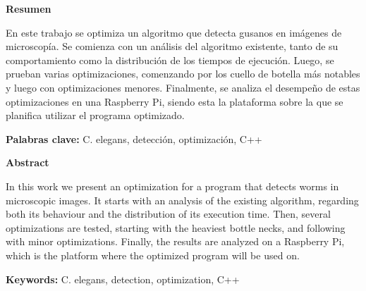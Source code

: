 \documentclass{article}
\newcommand{\comment}[1]{}
\begin{document}
\comment {
TODO:
1 - Agrandar algunos graficos
3 - Ver de agregar referencia

4 - página 5, párrafo 1: fijate que quedó "gusano" en singular y debe ser plural

5 - página 18, Fig 17: Los colores de la figura de la izquierda no entiendo en el orden que están. si fueran en orden del flujo de proceso seria mas facil de visualizar con las leyendas. Las leyendas están un poco chicas para impresión.

6 - Referencias: es deseable que en el texto vayan apareciendo en orden de numeración, y agregaría algunas más (al menos 5 más). Este punto podés por ejemplo hacer referencias a reviews, citar algun trabajo de machine learning cuando hablas de ello en la conclusión, citar algun manual de C++ cuando hablas de optimizaciones, etc
}

\centerline{\textbf{\LARGE{Resumen}}}
\vskip 0.2in

En este trabajo se optimiza un algoritmo que detecta gusanos en imágenes de microscopía. Se comienza con un análisis del algoritmo existente, tanto de su comportamiento como la distribución de los tiempos de ejecución. Luego, se prueban varias optimizaciones, comenzando por los cuello de botella más notables y luego con optimizaciones menores. Finalmente, se analiza el desempeño de estas optimizaciones en una Raspberry Pi, siendo esta la plataforma sobre la que se planifica utilizar el programa optimizado.

\vskip 0.2in
\textbf{Palabras clave:} C. elegans, detección, optimización, C++
\vskip 1in
\centerline{\textbf{\LARGE{Abstract}}}
\vskip 0.2in

In this work we present an optimization for a program that detects worms in microscopic images. It starts with an analysis of the existing algorithm, regarding both its behaviour and the distribution of its execution time. Then, several optimizations are tested, starting with the heaviest bottle necks, and following with minor optimizations. Finally, the results are analyzed on a Raspberry Pi, which is the platform where the optimized program will be used on.

\vskip 0.2in
\textbf{Keywords:} C. elegans, detection, optimization, C++

\newpage

\lhead{}
\tableofcontents
\lhead{}
\newpage

\lhead{}
\end{document}
